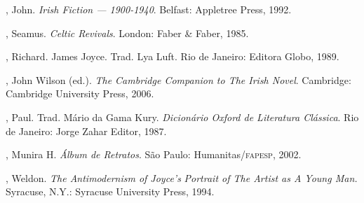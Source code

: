 \begin{bibliohedra}

, John. \textit{Irish Fiction --- 1900-1940}. Belfast: Appletree
Press, 1992.

, Seamus. \textit{Celtic Revivals}. London: Faber \& Faber, 1985.

, Richard. James Joyce. Trad. Lya Luft. Rio de Janeiro: Editora
Globo, 1989.

, John Wilson (ed.). \textit{The Cambridge Companion to The Irish
Novel}.  Cambridge: Cambridge University Press, 2006.

, Paul. Trad. Mário da Gama Kury. \textit{Dicionário Oxford de
\mbox{Literatura} Clássica}. Rio de Janeiro: Jorge Zahar Editor, 1987.

, Munira H. \textit{Álbum de Retratos}. São Paulo:
Humanitas/\textsc{fapesp}, 2002.

, Weldon. \textit{The Antimodernism of Joyce’s}
\textit{Portrait of The Artist as A Young Man.} Syracuse,
N.Y.: Syracuse University Press, 1994.

\end{bibliohedra}


